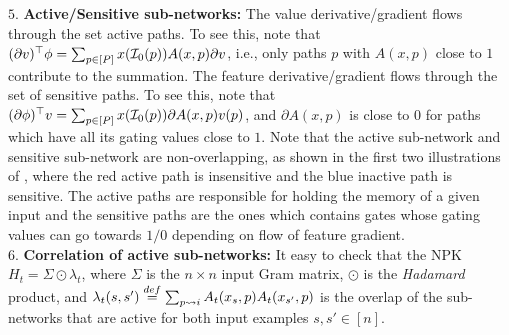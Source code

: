 $5.$ \textbf{Active/Sensitive sub-networks:} The value derivative/gradient flows through the set active paths. To see this, note that $(\partial v)^\top \phi=\sum_{p\in[P]}x(\mathcal{I}_0(p))A(x,p)\partial v$, i.e., only paths $p$ with $A(x,p)$ close to $1$ contribute to the summation. The feature derivative/gradient flows through the set of sensitive paths. To see this, note that $(\partial \phi)^\top v =\sum_{p\in[P]}x(\mathcal{I}_0(p))\partial A(x,p) v(p)$, and $\partial A(x,p)$ is close to $0$ for paths which have all its gating values close to $1$. Note that the active sub-network and sensitive sub-network are non-overlapping, as shown in the first two illustrations of , where the red active path is insensitive and the blue inactive path is sensitive. The active paths are responsible for holding the memory of a given input and the sensitive paths are the ones which contains gates whose gating values can go towards $1/0$ depending on flow of feature gradient.\\
$6.$ \textbf{Correlation of active sub-networks:} It easy to check that the NPK $H_t=\Sigma\odot \lambda_t$, where $\Sigma$ is the $n\times n$ input Gram matrix, $\odot$ is the \emph{Hadamard} product, and $\lambda_t(s,s')\stackrel{def}{=}\sum_{p\rightsquigarrow i} A_t(x_s,p) A_t(x_{s'},p)$ is the overlap of the sub-networks that are active for both input examples $s,s'\in[n]$. \\
